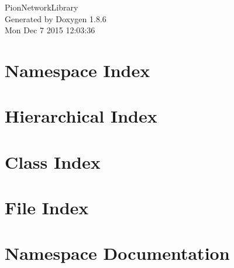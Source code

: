 \documentclass[twoside]{book}
\newcommand{\clearemptydoublepage}{%
  \newpage{\pagestyle{empty}\cleardoublepage}%
}
\begin{document}
\hypersetup{pageanchor=false}
\begin{titlepage}
\vspace*{7cm}
\begin{center}%
{\Large Pion\-Network\-Library }\\
\vspace*{1cm}
{\large Generated by Doxygen 1.8.6}\\
\vspace*{0.5cm}
{\small Mon Dec 7 2015 12:03:36}\\
\end{center}
\end{titlepage}
\clearemptydoublepage
\tableofcontents
\clearemptydoublepage
{}
\hypersetup{pageanchor=true}

\chapter{Namespace Index}

\chapter{Hierarchical Index}

\chapter{Class Index}

\chapter{File Index}

\chapter{Namespace Documentation}






\end{document}
